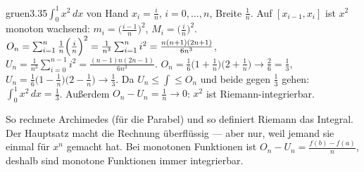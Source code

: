 \begin{loesungkarte}{gruen}{3.35}{$\int_0^1x^{2}\,dx$ von Hand}
$x_i = \frac in$, $i = 0, \dots, n$, Breite $\frac1n$. Auf $[x_{i-1}, x_i]$ ist $x^{2}$ monoton wachsend: $m_i = \bigl(\frac{i - 1}n\bigr)^{2}$, $M_i = \bigl(\frac in\bigr)^{2}$.
$O_n = \sum_{i=1}^{n}\frac1n\Bigl(\frac in\Bigr)^{2} = \frac1{n^{3}}\sum_{i=1}^{n}i^{2} = \frac{n(n + 1)(2n + 1)}{6n^{3}}$, \quad $U_n = \frac1{n^{3}}\sum_{i=0}^{n-1}i^{2} = \frac{(n - 1)n(2n - 1)}{6n^{3}}$.
$O_n = \frac16\bigl(1 + \frac1n\bigr)\bigl(2 + \frac1n\bigr)\to\frac26 = \frac13$, $U_n = \frac16\bigl(1 - \frac1n\bigr)\bigl(2 - \frac1n\bigr)\to\frac13$. Da $U_n\le\int\le O_n$ und beide gegen $\frac13$ gehen: $\int_0^1x^{2}\,dx = \frac13$. Außerdem $O_n - U_n = \frac1n\to0$: $x^{2}$ ist Riemann-integrierbar.
\begin{mitnehmen}\kastentext
So rechnete Archimedes (für die Parabel) und so definiert Riemann das Integral. Der Hauptsatz macht die Rechnung überflüssig --- aber nur, weil jemand sie einmal für $x^{n}$ gemacht hat. Bei monotonen Funktionen ist $O_n - U_n = \frac{f(b) - f(a)}n$, deshalb sind monotone Funktionen immer integrierbar.
\end{mitnehmen}
\end{loesungkarte}

